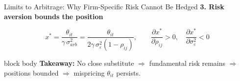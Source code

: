 \begin{frame}{Limits to Arbitrage: Why Firm-Specific Risk Cannot Be Hedged}
\textbf{\textcolor{inkblue}{3. Risk aversion bounds the position}}
\vspace{0.4em}

\[
x^{*} = \frac{\theta_{it}}{\gamma\,\sigma^2_{arb}} = \frac{\theta_{it}}{2\gamma\,\sigma_\varepsilon^2 (1-\rho_{ij})},
\qquad
\frac{\partial x^{*}}{\partial \rho_{ij}} > 0, \quad \frac{\partial x^{*}}{\partial \sigma_\varepsilon^2} < 0
\]

\begin{center}
\begin{beamercolorbox}[rounded=true,sep=4pt]{block body}
\centering\small
\textcolor{cinnabar}{\textbf{Takeaway:}} No close substitute $\Rightarrow$ fundamental risk remains
$\Rightarrow$ positions bounded $\Rightarrow$ mispricing $\theta_{it}$ persists.
\end{beamercolorbox}
\end{center}

\end{frame}
